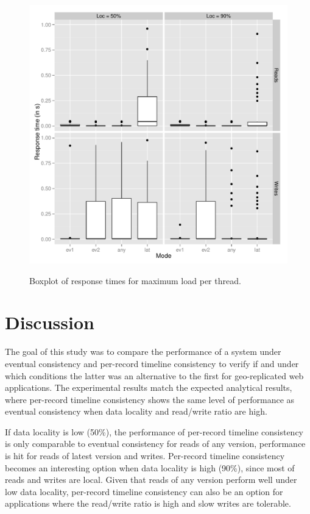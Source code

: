 \documentclass[doublespacing]{bmcart}
\begin{document}
\begin{figure}[h!]
\caption{Boxplot of response times for maximum load per thread.}
\includegraphics[width=1.0\textwidth]{boxplot200_max.png}
\label{fig:boxplot_dos_tempos_de_resposta_para_carga_maxima}
\end{figure}

\section{Discussion}

The goal of this study was to compare the performance of a system under
eventual consistency and per-record timeline consistency to verify if and under
which conditions the latter was an alternative to the first for geo-replicated
web applications. The experimental results match the expected analytical
results, where per-record timeline consistency shows the same level of
performance as eventual consistency when data locality and read/write ratio are
high.

If data locality is low (50\%), the performance of per-record timeline
consistency is only comparable to eventual consistency for reads of any
version, performance is hit for reads of latest version and writes.
Per-record timeline consistency becomes an interesting option when data
locality is high (90\%), since most of reads and writes are local. Given that
reads of any version perform well under low data locality, per-record timeline
consistency can also be an option for applications where the read/write ratio
is high and slow writes are tolerable.
\end{document}
